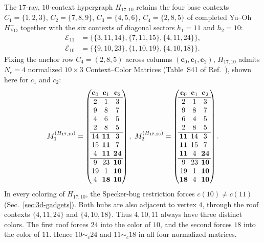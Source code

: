\documentclass[aps,pra,reprint,superscriptaddress,longbibliography,nofootinbib,floatfix,10pt]{revtex4-2}
\theoremstyle{definition}\newtheorem{definition}[theorem]{Definition}
\theoremstyle{remark}\newtheorem{remark}[theorem]{Remark}
\newcommand{\YO}{\mathrm{YO}}\newcommand{\ip}[2]{\langle #1,#2\rangle}
\begin{document}
The $17$-ray, $10$-context hypergraph $H_{17,10}$ retains the four base contexts $C_1=\{1,2,3\}$, $C_2=\{7,8,9\}$, $C_3=\{4,5,6\}$, $C_4=\{2,8,5\}$ of completed Yu--Oh $H_{\YO}^+$ together with the six contexts of diagonal sectors $h_1=11$ and $h_2=10$:
\begin{equation}\label{eq:H17-sectors}
\begin{aligned}
\mathcal{E}_{11}&=\bigl\{\{3,11,14\},\{7,11,15\},\{4,11,24\}\bigr\},\\
\mathcal{E}_{10}&=\bigl\{\{9,10,23\},\{1,10,19\},\{4,10,18\}\bigr\}.
\end{aligned}
\end{equation}
Fixing the anchor row $C_4=(2,8,5)$ across columns $(\mathbf{c}_0,\mathbf{c}_1,\mathbf{c}_2)$, $H_{17,10}$ admits $N_c=4$ normalized $10\times 3$ Context--Color Matrices (Table~S41 of Ref.~\cite{supplement}), shown here for $c_1$ and $c_2$:
\begin{equation}\label{eq:H17-matrices}
\setlength{\arraycolsep}{2.2pt}
M_1^{(H_{17,10})}=\begin{pmatrix}
\mathbf{c}_0&\mathbf{c}_1&\mathbf{c}_2\\\hline
2&1&3\\
9&8&7\\
4&6&5\\
2&8&5\\\hline
14&\mathbf{11}&3\\
15&\mathbf{11}&7\\
4&\mathbf{11}&\mathbf{24}\\\hline
9&23&\mathbf{10}\\
19&1&\mathbf{10}\\
4&\mathbf{18}&\mathbf{10}
\end{pmatrix},\ 
M_2^{(H_{17,10})}=\begin{pmatrix}
\mathbf{c}_0&\mathbf{c}_1&\mathbf{c}_2\\\hline
2&1&3\\
9&8&7\\
6&4&5\\
2&8&5\\\hline
\mathbf{11}&14&3\\
\mathbf{11}&15&7\\
\mathbf{11}&4&\mathbf{24}\\\hline
9&23&\mathbf{10}\\
19&1&\mathbf{10}\\
\mathbf{18}&4&\mathbf{10}
\end{pmatrix}.
\end{equation}
In every coloring of $H_{17,10}$, the Specker-bug restriction forces $c(10)\ne c(11)$ (Sec.~\ref{sec:3d-gadgets}). Both hubs are also adjacent to vertex $4$, through the roof contexts $\{4,11,24\}$ and $\{4,10,18\}$. Thus $4,10,11$ always have three distinct colors. The first roof forces $24$ into the color of $10$, and the second forces $18$ into the color of $11$. Hence $10\sim_c24$ and $11\sim_c18$ in all four normalized matrices.
\end{document}
